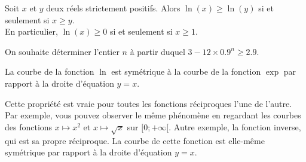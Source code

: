 \documentclass[11pt,fleqn, openany]{book} %
\begin{document}
\begin{proposition}Soit $x$ et $y$ deux réels strictement positifs. Alors $\ln(x)\geqslant\ln(y)$ si et seulement si $x\geqslant y$.\\
En particulier, $\ln(x) \geqslant 0$ si et seulement si $x\geqslant 1$.\end{proposition}

\begin{example}On souhaite déterminer l'entier $n$ à partir duquel $3-12 \times 0.9^n \geqslant 2.9$.


\vskip200pt
\end{example}

\begin{proposition}La courbe de la fonction $\ln$ est symétrique à la courbe de la fonction $\exp$ par rapport à la droite d'équation $y=x$.\end{proposition}

\begin{center}
\end{center}

Cette propriété est vraie pour toutes les fonctions réciproques l'une de l'autre. Par exemple, vous pouvez observer le même phénomène en regardant les courbes des fonctions $x\mapsto x^2$ et $x\mapsto \sqrt{x}$ sur $[0;+\infty[$. Autre exemple, la fonction inverse, qui est sa propre réciproque. La courbe de cette fonction est elle-même symétrique par rapport à la droite d'équation $y=x$.
\end{document}
